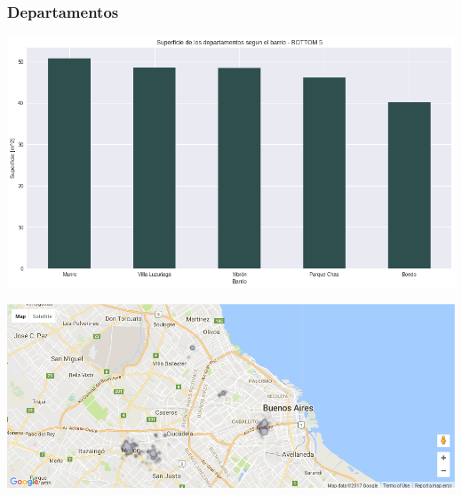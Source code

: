 \documentclass[a4paper, 10pt]{article}
\begin{document}
				\subsubsection{Departamentos}
					\begin{center}
   		    				\includegraphics[width=\textwidth]{images/apartmentSurfaceBottomBar}
				  	\end{center}
				  	\begin{center}
   		    				\includegraphics[width=\textwidth]{images/apartmentSurfaceBottomMap}
				  	\end{center}
\end{document}
